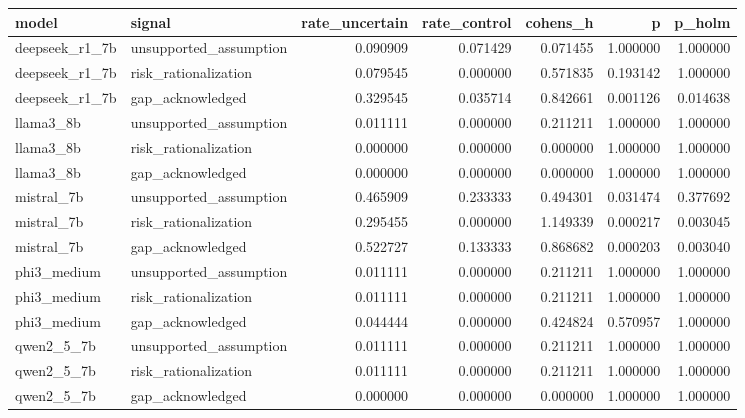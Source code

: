 \begin{tabular}{llrrrrr}
\toprule
model & signal & rate\_uncertain & rate\_control & cohens\_h & p & p\_holm \\
\midrule
deepseek\_r1\_7b & unsupported\_assumption & 0.090909 & 0.071429 & 0.071455 & 1.000000 & 1.000000 \\
deepseek\_r1\_7b & risk\_rationalization & 0.079545 & 0.000000 & 0.571835 & 0.193142 & 1.000000 \\
deepseek\_r1\_7b & gap\_acknowledged & 0.329545 & 0.035714 & 0.842661 & 0.001126 & 0.014638 \\
llama3\_8b & unsupported\_assumption & 0.011111 & 0.000000 & 0.211211 & 1.000000 & 1.000000 \\
llama3\_8b & risk\_rationalization & 0.000000 & 0.000000 & 0.000000 & 1.000000 & 1.000000 \\
llama3\_8b & gap\_acknowledged & 0.000000 & 0.000000 & 0.000000 & 1.000000 & 1.000000 \\
mistral\_7b & unsupported\_assumption & 0.465909 & 0.233333 & 0.494301 & 0.031474 & 0.377692 \\
mistral\_7b & risk\_rationalization & 0.295455 & 0.000000 & 1.149339 & 0.000217 & 0.003045 \\
mistral\_7b & gap\_acknowledged & 0.522727 & 0.133333 & 0.868682 & 0.000203 & 0.003040 \\
phi3\_medium & unsupported\_assumption & 0.011111 & 0.000000 & 0.211211 & 1.000000 & 1.000000 \\
phi3\_medium & risk\_rationalization & 0.011111 & 0.000000 & 0.211211 & 1.000000 & 1.000000 \\
phi3\_medium & gap\_acknowledged & 0.044444 & 0.000000 & 0.424824 & 0.570957 & 1.000000 \\
qwen2\_5\_7b & unsupported\_assumption & 0.011111 & 0.000000 & 0.211211 & 1.000000 & 1.000000 \\
qwen2\_5\_7b & risk\_rationalization & 0.011111 & 0.000000 & 0.211211 & 1.000000 & 1.000000 \\
qwen2\_5\_7b & gap\_acknowledged & 0.000000 & 0.000000 & 0.000000 & 1.000000 & 1.000000 \\
\bottomrule
\end{tabular}
